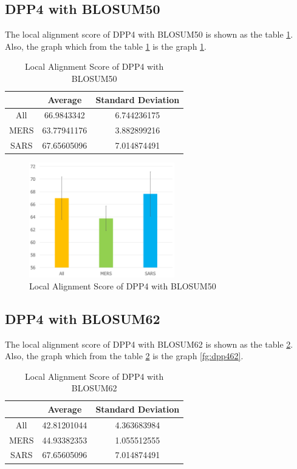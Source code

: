\documentclass[aps,10pt,a4paper]{article}
\begin{document}
		\subsection{DPP4 with BLOSUM50}
			The local alignment score of DPP4 with BLOSUM50 is shown as the table \ref{tb:dpp450}. Also, the graph which from the table \ref{tb:dpp450} is the graph \ref{fg:dpp450}. 
			\begin{table}[h!]
				\centering
				\caption{Local Alignment Score of DPP4 with BLOSUM50}
				\label{tb:dpp450}
				\begin{tabular}{ c || c | c }
					& Average & Standard Deviation \\ \hline
					All & 66.9843342 & 6.744236175 \\
					MERS & 63.77941176 & 3.882899216 \\
					SARS & 67.65605096 & 7.014874491 \\
				\end{tabular}
			\end{table}
	
			\begin{figure}[htbp]
				\centering
				\includegraphics[height=5cm]{DPP450}
				\caption{Local Alignment Score of DPP4 with BLOSUM50}
				\label{fg:dpp450}
			\end{figure}
		
		\subsection{DPP4 with BLOSUM62}
			The local alignment score of DPP4 with BLOSUM62 is shown as the table \ref{tb:dpp462}. Also, the graph which from the table \ref{tb:dpp462} is the graph \ref{fg:dpp462}. 
			\begin{table}[h!]
				\centering
				\caption{Local Alignment Score of DPP4 with BLOSUM62}
				\label{tb:dpp462}
				\begin{tabular}{ c || c | c }
					& Average & Standard Deviation \\ \hline
					All & 42.81201044 & 4.363683984 \\
					MERS & 44.93382353 & 1.055512555 \\ 
					SARS & 67.65605096 & 7.014874491 \\
				\end{tabular}
			\end{table}
		
\end{document}
